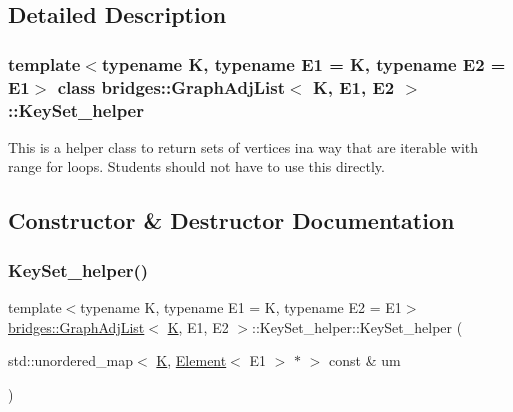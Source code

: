 \subsection{Detailed Description}
\subsubsection*{template$<$typename K, typename E1 = K, typename E2 = E1$>$\newline
class bridges\+::\+Graph\+Adj\+List$<$ K, E1, E2 $>$\+::\+Key\+Set\+\_\+helper}

This is a helper class to return sets of vertices ina way that are iterable with range for loops. Students should not have to use this directly. 

\subsection{Constructor \& Destructor Documentation}
\mbox{\label{classbridges_1_1_graph_adj_list_1_1_key_set__helper_a60ca294eeeae0ebf9d357ff4f197214e}} 
\subsubsection{\texorpdfstring{Key\+Set\+\_\+helper()}{KeySet\_helper()}}
{\footnotesize\ttfamily template$<$typename K, typename E1 = K, typename E2 = E1$>$ \\
\hyperlink{classbridges_1_1_graph_adj_list}{bridges\+::\+Graph\+Adj\+List}$<$ \hyperlink{namespacebridges_acfb0a4f7877d8f63de3e6862004c50edaa5f3c6a11b03839d46af9fb43c97c188}{K}, E1, E2 $>$\+::Key\+Set\+\_\+helper\+::\+Key\+Set\+\_\+helper (\begin{DoxyParamCaption}\item[{std\+::unordered\+\_\+map$<$ \hyperlink{namespacebridges_acfb0a4f7877d8f63de3e6862004c50edaa5f3c6a11b03839d46af9fb43c97c188}{K}, \hyperlink{classbridges_1_1_element}{Element}$<$ E1 $>$ $\ast$ $>$ const \&}]{um }\end{DoxyParamCaption})\hspace{0.3cm}{\ttfamily [inline]}}



